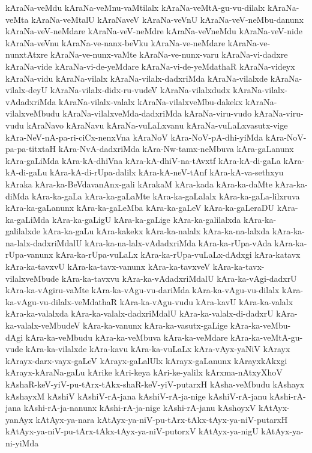 {kAraNa-veMdu
kAraNa-veMnu-vaMtilalx
kAraNa-veMtA-gu-vu-dilalx
kAraNa-veMta
kAraNa-veMtalU
kAraNaveV
kAraNa-veVnU
kAraNa-veV-neMbu-danunx
kAraNa-veV-neMdare
kAraNa-veV-neMdre
kAraNa-veVneMdu
kAraNa-veV-nide
kAraNa-veVnu
kAraNa-ve-nanx-beVku
kAraNa-ve-neMdare
kAraNa-ve-nunxtAtxre
kAraNa-ve-nunx-vaMte
kAraNa-ve-nunx-varu
kAraNa-vi-dadxre
kAraNa-vide
kAraNa-vi-de-yeMdare
kAraNa-vi-de-yeMdathaR
kAraNa-videyx
kAraNa-vidu
kAraNa-vilalx
kAraNa-vilalx-dadxriMda
kAraNa-vilalxde
kAraNa-vilalx-deyU
kAraNa-vilalx-didx-ru-vudeV
kAraNa-vilalxdudx
kAraNa-vilalx-vAdadxriMda
kAraNa-vilalx-valalx
kAraNa-vilalxveMbu-dakekx
kAraNa-vilalxveMbudu
kAraNa-vilalxveMda-dadxriMda
kAraNa-viru-vudo
kAraNa-viru-vudu
kAraNavo
kAraNavu
kAraNa-vuLaLxvanu
kAraNa-vuLaLxvasutx-vige
kAra-NeV-nA-pa-ri-ciCx-nenxVna
kAraNoV
kAra-NoV-pA-dhi-yiMda
kAra-NoV-pa-pa-titxtaH
kAra-NvA-dadxriMda
kAra-Nw-tamx-neMbuva
kAra-gaLanunx
kAra-gaLiMda
kAra-kA-dhiVna
kAra-kA-dhiV-na-tAvxtf
kAra-kA-di-gaLa
kAra-kA-di-gaLu
kAra-kA-di-rUpa-dalilx
kAra-kA-neV-tAnf
kAra-kA-va-sethxyu
kAraka
kAra-ka-BeVdavanAnx-gali
kArakaM
kAra-kada
kAra-ka-daMte
kAra-ka-diMda
kAra-ka-gaLa
kAra-ka-gaLaMte
kAra-ka-gaLalalx
kAra-ka-gaLa-lilxruva
kAra-ka-gaLanunx
kAra-ka-gaLeMba
kAra-ka-gaLeV
kAra-ka-gaLeraDU
kAra-ka-gaLiMda
kAra-ka-gaLigU
kAra-ka-gaLige
kAra-ka-galilalxda
kAra-ka-galilalxde
kAra-ka-gaLu
kAra-kakekx
kAra-ka-nalalx
kAra-ka-na-lalxda
kAra-ka-na-lalx-dadxriMdalU
kAra-ka-na-lalx-vAdadxriMda
kAra-ka-rUpa-vAda
kAra-ka-rUpa-vanunx
kAra-ka-rUpa-vuLaLx
kAra-ka-rUpa-vuLaLx-dAdxgi
kAra-katavx
kAra-ka-tavxvU
kAra-ka-tavx-vanunx
kAra-ka-tavxveV
kAra-ka-tavx-vilalxveMbude
kAra-ka-tavxvu
kAra-ka-vAdadxriMdalU
kAra-ka-vAgi-dadxrU
kAra-ka-vAgiru-vaMte
kAra-ka-vAgu-vu-dariMda
kAra-ka-vAgu-vu-dilalx
kAra-ka-vAgu-vu-dilalx-veMdathaR
kAra-ka-vAgu-vudu
kAra-kavU
kAra-ka-valalx
kAra-ka-valalxda
kAra-ka-valalx-dadxriMdalU
kAra-ka-valalx-di-dadxrU
kAra-ka-valalx-veMbudeV
kAra-ka-vanunx
kAra-ka-vasutx-gaLige
kAra-ka-veMbu-dAgi
kAra-ka-veMbudu
kAra-ka-veMbuva
kAra-ka-veMdare
kAra-ka-veMtA-gu-vude
kAra-ka-vilalxde
kAra-kavu
kAra-ka-vuLaLx
kAra-vAyx-yaNiV
kArayx
kArayx-darx-vayx-gaLeV
kArayx-gaLalUlx
kArayx-gaLanunx
kArayxkAkxgi
kArayx-kAraNa-gaLu
kArike
kAri-keya
kAri-ke-yalilx
kArxma-nAtxyXhoV
kAshaR-keV-yiV-pu-tArx-tAkx-shaR-keV-yiV-putarxH
kAsha-veMbudu
kAshayx
kAshayxM
kAshiV
kAshiV-rA-jana
kAshiV-rA-ja-nige
kAshiV-rA-janu
kAshi-rA-jana
kAshi-rA-ja-nanunx
kAshi-rA-ja-nige
kAshi-rA-janu
kAshoyxV
kAtAyx-yanAyx
kAtAyx-ya-nara
kAtAyx-ya-niV-pu-tArx-tAkx-tAyx-ya-niV-putarxH
kAtAyx-ya-niV-pu-tArx-tAkx-tAyx-ya-niV-putorxV
kAtAyx-ya-nigU
kAtAyx-ya-ni-yiMda
}
